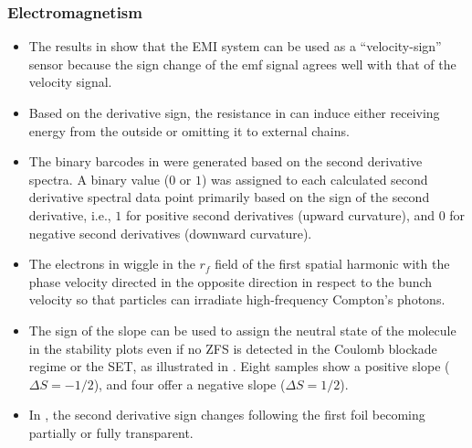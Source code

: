 \documentclass[11pt]{book}
\begin{document}
\subsubsection{Electromagnetism}
\begin{itemize}
\item The results in \cite{jung2009experimental}
show that the EMI system can be used as a \textquotedblleft velocity-sign\textquotedblright{}
sensor because the sign change of the emf signal agrees well with
that of the velocity signal.
\item Based on the derivative sign, the resistance in \cite{mende2012new}
can induce either receiving energy from the outside or omitting it
to external chains.
\item The binary barcodes in \cite{wang2013raman}
were generated based on the second derivative spectra. A binary value
($0$ or $1$) was assigned to each calculated second derivative spectral
data point primarily based on the sign of the second derivative, i.e.,
$1$ for positive second derivatives (upward curvature), and $0$
for negative second derivatives (downward curvature).
\item The electrons in \cite{kuzikov2014flying} wiggle
in the $r_{f}$ field of the first spatial harmonic with the phase
velocity directed in the opposite direction in respect to the bunch
velocity so that particles can irradiate high-frequency Compton's
photons.
\item The sign of the slope can be used to assign the neutral state of the
molecule in the stability plots even if no ZFS is detected in the
Coulomb blockade regime or the SET, as illustrated in \cite{burzuri2015observing}.
Eight samples show a positive slope ($\Delta S=-1/2$), and four offer
a negative slope ($\Delta S=1/2$).
\item In \cite{konoplev2020design},
the second derivative sign changes following the first foil becoming
partially or fully transparent.
\end{itemize}
\end{document}
